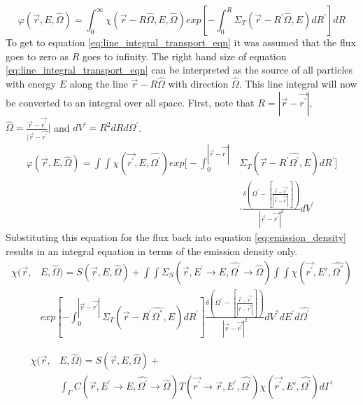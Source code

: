 \vspace{0.5cm}
\begin{equation}
    \varphi(\vec{r},E,\hat{\Omega}) = 
    \int_0^{\infty} \chi(\vec{r} - R\hat{\Omega},E,\hat{\Omega})
    exp\left[-\int_0^R \Sigma_T(\vec{r}-R^{'}\hat{\Omega},E)dR^{'} \right] dR
  \label{eq:line_integral_transport_eqn}
\end{equation}
To get to equation \ref{eq:line_integral_transport_eqn} it was assumed that the
flux goes to zero as $R$ goes to infinity. The right hand size of equation 
\ref{eq:line_integral_transport_eqn} can be interpreted as the source of all
particles with energy $E$ along the line $\vec{r}-R\hat{\Omega}$ with direction
$\hat{\Omega}$. This line integral will now be converted to an integral over 
all space. First, note that $R = |\vec{r} - \vec{r^{'}}|$,
$\hat{\Omega} = \frac{\vec{r} - \vec{r^{'}}}{|\vec{r} - \vec{r^{'}}}|$ and
$dV^{'} = R^2dRd\hat{\Omega^{'}}$.
\begin{equation}
  \begin{split}
    \varphi(\vec{r},E,\hat{\Omega}) = 
    \int\int \chi(\vec{r^{'}},E,\hat{\Omega^{'}})
    exp\Big[-\int_0^{|\vec{r} - \vec{r^{'}}|} 
      &\Sigma_T(\vec{r}-R^{'}\hat{\Omega^{'}},E)dR^{'} \Big] \\
    &\cdot \frac{\delta \left(\Omega^{'} - \left[\frac{\vec{r} - \vec{r^{'}}}
        {|\vec{r} - \vec{r^{'}}|}\right]\right)}
    {|\vec{r} - \vec{r^{'}}|^2} dV^{'}
  \end{split}
  \label{eq:volume_integral_transport_eqn}
\end{equation}
Substituting this equation for the flux back into equation 
\ref{eq:emission_density} results in an integral equation in terms of the 
emission density only. 
\begin{equation*}
  \begin{split}
    \chi(\vec{r},&E,\hat{\Omega}) = S(\vec{r},E,\hat{\Omega}) +
    \int\int \Sigma_S(\vec{r},E^{'} \to E, \hat{\Omega^{'}} \to \hat{\Omega})
    \int\int \chi(\vec{r^{'}},E',\hat{\Omega^{''}}) \\
    & exp\left[-\int_0^{|\vec{r} - \vec{r^{'}}|} 
      \Sigma_T(\vec{r}-R^{'}\hat{\Omega^{''}},E)dR^{'} \right]
    \frac{\delta \left(\Omega^{''} - \left[\frac{\vec{r} - \vec{r^{'}}}
        {|\vec{r} - \vec{r^{'}}|}\right]\right)}
    {|\vec{r} - \vec{r^{'}}|^2} dV^{''}dE^{'}d\hat{\Omega^{'}}
  \end{split}
\end{equation*}

\begin{equation}
  \begin{split}
    \chi(\vec{r},&E,\hat{\Omega}) = S(\vec{r},E,\hat{\Omega}) + \\
    &\int_{\Gamma}C(\vec{r},E^{'} \to E,\hat{\Omega^{'}} \to \hat{\Omega})
    T(\vec{r^{'}} \to \vec{r},E^{'},\hat{\Omega^{'}}) 
    \chi(\vec{r^{'}},E',\hat{\Omega^{'}}) d\Gamma^{'}
  \end{split}
  \label{eq:emission_density_integral_eqn}
\end{equation}

